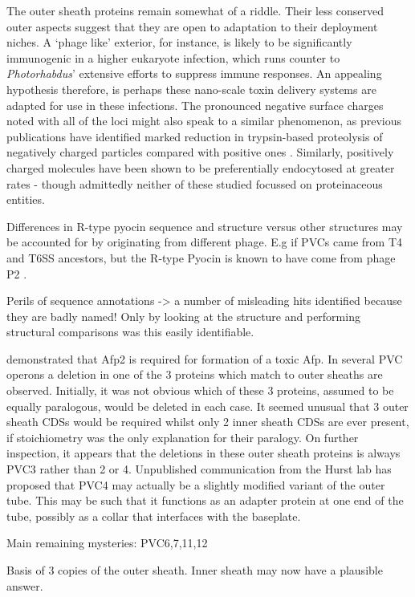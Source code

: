 The outer sheath proteins remain somewhat of a riddle. Their less conserved outer aspects suggest that they are open to adaptation to their deployment niches. A `phage like' exterior, for instance, is likely to be significantly immunogenic in a higher eukaryote infection, which runs counter to \emph{Photorhabdus}' extensive efforts to suppress immune responses. An appealing hypothesis therefore, is perhaps these nano-scale toxin delivery systems are adapted for use in these infections. The pronounced negative surface charges noted with all of the loci might also speak to a similar phenomenon, as previous publications have identified marked reduction in trypsin-based proteolysis of negatively charged particles compared with positive ones \citep{Liu1992}. Similarly, positively charged molecules have been shown to be preferentially endocytosed at greater rates \citep{Chung2007} - though admittedly neither of these studied focussed on proteinaceous entities.

Differences in R-type pyocin sequence and structure versus other structures may be accounted for by originating from different phage. E.g if PVCs came from T4 and T6SS ancestors, but the R-type Pyocin is known to have come from phage P2 \citep{Nakayama2000}.


Perils of sequence annotations -> a number of misleading hits identified because they are badly named! Only by looking at the structure and performing structural comparisons was this easily identifiable.

\cite{Hurst2004} demonstrated that Afp2 is required for formation of a toxic Afp. In several PVC operons a deletion in one of the 3 proteins which match to outer sheaths are observed. Initially, it was not obvious which of these 3 proteins, assumed to be equally paralogous, would be deleted in each case. It seemed unusual that 3 outer sheath CDSs would be required whilst only 2 inner sheath CDSs are ever present, if stoichiometry was the only explanation for their paralogy. On further inspection, it appears that the deletions in these outer sheath proteins is always PVC3 rather than 2 or 4. Unpublished communication from the Hurst lab has proposed that PVC4 may actually be a slightly modified variant of the outer tube. This may be such that it functions as an adapter protein at one end of the tube, possibly as a collar that interfaces with the baseplate.

Main remaining mysteries:
PVC6,7,11,12

Basis of 3 copies of the outer sheath. Inner sheath may now have a plausible answer.


